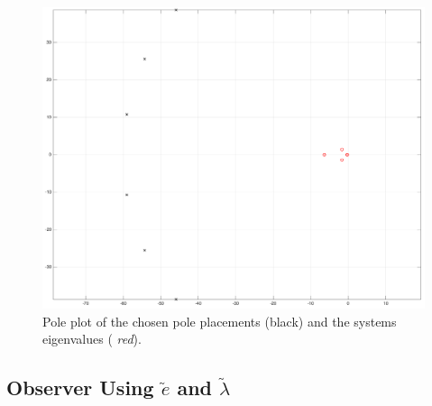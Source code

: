 %
\begin{figure}[H]
    \centering
    \includegraphics[width=\textwidth]{poleplacement.png}
    \caption{Pole plot of the chosen pole placements (black) and the systems eigenvalues (\emph{\color{red} red}).}
    \label{fig:poles}
\end{figure}
%

\subsection{Observer Using $\tilde{e}$ and $\tilde{\lambda}$}

